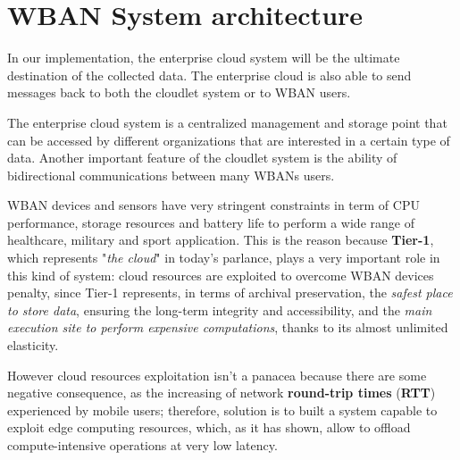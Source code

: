 \documentclass[sigchi]{acmart}
\begin{document}
\section{WBAN System architecture}

\vspace{0.3cm}

\begin{quoting}[font=itshape, begintext={``}, endtext={''\cite[par.~3.2]{MSAReport}}]
In our implementation, the enterprise cloud system will be the ultimate destination of the collected data. The enterprise cloud is also able to send messages back to both the cloudlet system or to WBAN users.
\end{quoting}

\vspace{0.3cm}

\begin{quoting}[font=itshape, begintext={``}, endtext={''\cite[par.~4.1]{MSAReport}}]
The enterprise cloud system is a centralized management and storage point that can be accessed by different organizations that are interested in a certain type of data. Another important feature of the cloudlet system is the ability of bidirectional communications between many WBANs users.
\end{quoting}

\vspace{0.3cm}

WBAN devices and sensors have very stringent constraints in term of CPU performance, storage resources and battery life to perform a wide range of healthcare, military and sport application. This is the reason because \textbf{Tier-1}, which represents "\textit{the cloud}" in today's parlance, plays a very important role in this kind of system: cloud resources are exploited to overcome WBAN devices penalty, since Tier-1 represents, in terms of archival preservation, the \textit{safest place to store data}, ensuring the long-term integrity and accessibility, and the \textit{main execution site to perform expensive computations}, thanks to its almost unlimited elasticity. 

However cloud resources exploitation isn't a panacea because there are some negative consequence, as the increasing of network \textbf{round-trip times} (\textbf{RTT}) experienced by mobile users; therefore, \citet{MSAReport} solution is to built a system capable to exploit edge computing resources, which, as it has shown, allow to offload compute-intensive operations at very low latency.\cite{TheSeminalRoleEdgeNativeApplications}\cite{TheEmergenceOfEdgeComputing}
\end{document}
